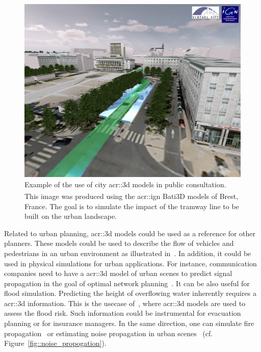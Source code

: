             \begin{figure}[htpb]
                \centering
                \includegraphics[width=\textwidth]{images/introduction/3d_model_applications/brest_tramway}
                \caption[
                    Example of the use of city \acrshort*{acr::3d} models in public consultation.
                ]{
                    \label{fig::public_consultation}
                    Example of the use of city \gls{acr::3d} models in public consultation.
                    This image was produced using the \gls{acr::ign} Bati3D\textsuperscript{\textregistered} models of Brest, France.
                    The goal is to simulate the impact of the tramway line to be built on the urban landscape.
                }
            \end{figure}

            Related to urban planning, \gls{acr::3d} models could be used as a reference for other planners.
            These models could be used to describe the flow of vehicles and pedestrians in an urban environment as illustrated in~\textcite{vanhoey2017varcity}.
            In addition, it could be used in physical simulations for urban applications.
            For instance, communication companies need to have a \gls{acr::3d} model of urban scenes to predict signal propagation in the goal of optimal network planning~\parencite{yun2007radio}.
            It can be also useful for flood simulation.
            Predicting the height of overflowing water inherently requires a \gls{acr::3d} information.
            This is the usecase of~\textcite{varduhn2015multi}, where \gls{acr::3d} models are used to assess the flood risk.
            Such information could be instrumental for evacuation planning or for insurance managers.
            In the same direction, one can simulate fire propagation~\parencite{dimitropoulos2010fire} or estimating noise propagation in urban scenes~\parencite{stoter20083d} (cf. Figure~\ref{fig::noise_propogation}).


